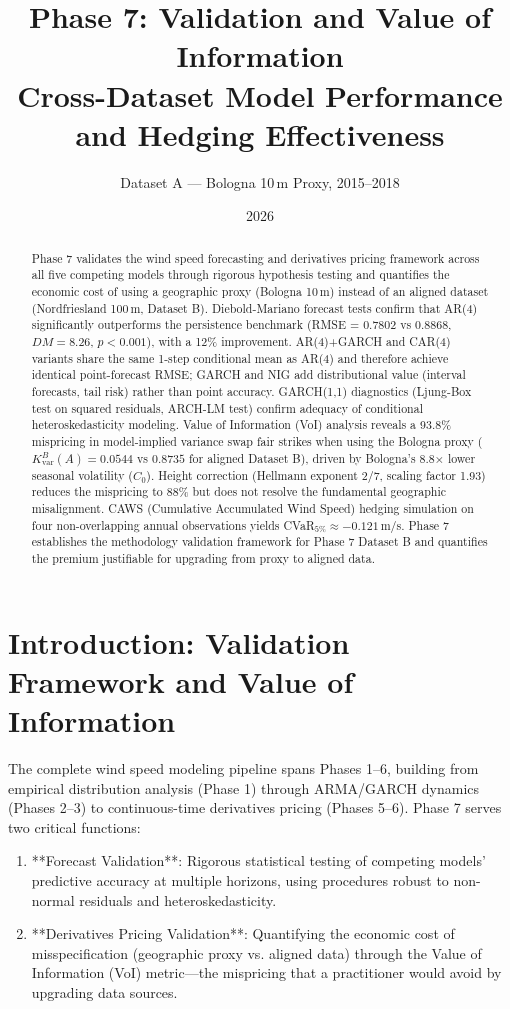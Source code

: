\documentclass[11pt, a4paper, twoside]{article}
\title{\textbf{Phase 7: Validation and Value of Information \\ Cross-Dataset Model Performance and Hedging Effectiveness}}
\author{Dataset A --- Bologna 10\,m Proxy, 2015--2018}
\date{2026}
\begin{document}
\maketitle

\begin{abstract}
Phase 7 validates the wind speed forecasting and derivatives pricing framework across all five competing models through rigorous hypothesis testing and quantifies the economic cost of using a geographic proxy (Bologna 10\,m) instead of an aligned dataset (Nordfriesland 100\,m, Dataset B). Diebold-Mariano forecast tests confirm that AR(4) significantly outperforms the persistence benchmark (RMSE = 0.7802 vs 0.8868, $DM = 8.26$, $p < 0.001$), with a 12\% improvement. AR(4)+GARCH and CAR(4) variants share the same 1-step conditional mean as AR(4) and therefore achieve identical point-forecast RMSE; GARCH and NIG add distributional value (interval forecasts, tail risk) rather than point accuracy. GARCH(1,1) diagnostics (Ljung-Box test on squared residuals, ARCH-LM test) confirm adequacy of conditional heteroskedasticity modeling. Value of Information (VoI) analysis reveals a 93.8\% mispricing in model-implied variance swap fair strikes when using the Bologna proxy ($K_{\text{var}}^B(A) = 0.0544$ vs $0.8735$ for aligned Dataset B), driven by Bologna's 8.8× lower seasonal volatility ($C_0$). Height correction (Hellmann exponent 2/7, scaling factor 1.93) reduces the mispricing to 88\% but does not resolve the fundamental geographic misalignment. CAWS (Cumulative Accumulated Wind Speed) hedging simulation on four non-overlapping annual observations yields CVaR$_{5\%} \approx -0.121$\,m/s. Phase 7 establishes the methodology validation framework for Phase 7 Dataset B and quantifies the premium justifiable for upgrading from proxy to aligned data.
\end{abstract}

\section{Introduction: Validation Framework and Value of Information}

The complete wind speed modeling pipeline spans Phases 1--6, building from empirical distribution analysis (Phase 1) through ARMA/GARCH dynamics (Phases 2--3) to continuous-time derivatives pricing (Phases 5--6). Phase 7 serves two critical functions:

\begin{enumerate}
\item **Forecast Validation**: Rigorous statistical testing of competing models' predictive accuracy at multiple horizons, using procedures robust to non-normal residuals and heteroskedasticity.

\item **Derivatives Pricing Validation**: Quantifying the economic cost of misspecification (geographic proxy vs. aligned data) through the Value of Information (VoI) metric---the mispricing that a practitioner would avoid by upgrading data sources.
\end{enumerate}
\end{document}
